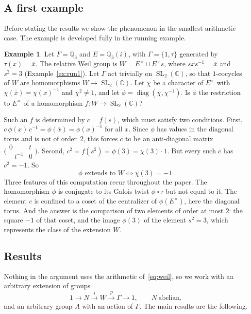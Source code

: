 \documentclass[12pt,letterpaper]{article}
\numberwithin{equation}{section}
\theoremstyle{plain}
\theoremstyle{definition}
\newtheorem{example}[theorem]{Example}
\newcommand{\C}{\mathbb{C}}
\newcommand{\Q}{\mathbb{Q}}
\DeclareMathOperator{\SL}{SL}
\DeclareMathOperator{\diag}{diag}
\begin{document}
\subsection{A first example}\label{ss:first}

Before stating the results we show the phenomenon in the smallest
arithmetic case. The example is developed fully in the running example.

\begin{example}\label{ex:first}
Let $F=\Q_3$ and $E=\Q_3(i)$, with $\Gamma=\{1,\tau\}$ generated by
$\tau(x)=\overline{x}$. The relative Weil group is
$W=E^\times\sqcup E^\times s$, where $sxs^{-1}=\overline{x}$ and $s^2=3$
(Example~\ref{ex:run1}). Let $\Gamma$ act trivially on $\SL_2(\C)$, so
that $1$-cocycles of $W$ are homomorphisms $W\to\SL_2(\C)$. Let $\chi$ be a
character of $E^\times$ with $\chi(\overline{x})=\chi(x)^{-1}$ and
$\chi^2\neq1$, and let $\phi=\diag(\chi,\chi^{-1})$. Is $\phi$ the
restriction to $E^\times$ of a homomorphism $f:W\to\SL_2(\C)$?

Such an $f$ is determined by $c=f(s)$, which must satisfy two conditions.
First, $c\,\phi(x)\,c^{-1}=\phi(\overline{x})=\phi(x)^{-1}$ for all $x$.
Since $\phi$ has values in the diagonal torus and is not of order~$2$,
this forces $c$ to be an anti-diagonal matrix
$\bigl(\begin{smallmatrix}0&t\\-t^{-1}&0\end{smallmatrix}\bigr)$. Second,
$c^2=f(s^2)=\phi(3)=\chi(3)\cdot1$. But every such $c$ has $c^2=-1$. So
\[
\phi \text{ extends to } W\iff\chi(3)=-1 .
\]
Three features of this computation recur throughout the paper. The
homomorphism $\phi$ is conjugate to its Galois twist $\phi\circ\tau$ but
not equal to it. The element $c$ is confined to a coset of the centralizer
of $\phi(E^\times)$, here the diagonal torus. And the answer is the
comparison of two elements of order at most $2$: the square $-1$ of that
coset, and the image $\phi(3)$ of the element $s^2=3$, which represents
the class of the extension $W$.
\end{example}

\subsection{Results}

Nothing in the argument uses the arithmetic of~\eqref{eq:weil}, so we work
with an arbitrary extension of groups
\[
1\longrightarrow N\overset{i}{\longrightarrow} W
\overset{p}{\longrightarrow}\Gamma\longrightarrow 1 ,\qquad N\ \text{abelian},
\]
and an arbitrary group $A$ with an action of $\Gamma$. The main results are
the following.
\end{document}
